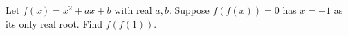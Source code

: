 Let $f(x)=x^2+ax+b$ with real $a,b$. Suppose $f(f(x))=0$ has $x=-1$ as its only real root. Find $f(f(1))$.
